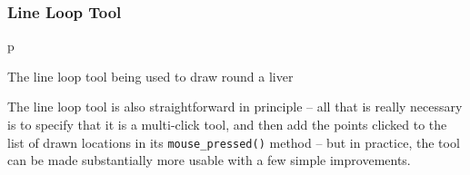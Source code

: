 \subsubsection{Line Loop Tool}

\begin{stusubfig}{p}
	\hspace{4mm}%
\caption{The line loop tool being used to draw round a liver}
\label{fig:appendixval-linelooptool}
\end{stusubfig}

The line loop tool is also straightforward in principle -- all that is really necessary is to specify that it is a multi-click tool, and then add the points clicked to the list of drawn locations in its \texttt{mouse_pressed()} method -- but in practice, the tool can be made substantially more usable with a few simple improvements.

